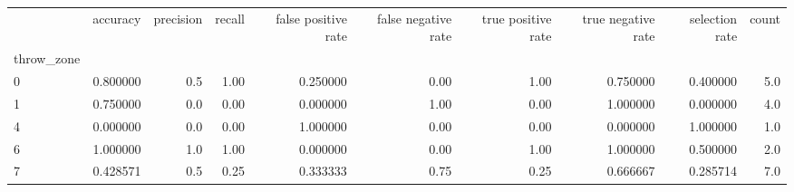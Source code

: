 \begin{tabular}{lrrrrrrrrr}
\toprule
{} &  accuracy &  precision &  recall &  false positive rate &  false negative rate &  true positive rate &  true negative rate &  selection rate &  count \\
throw\_zone &           &            &         &                      &                      &                     &                     &                 &        \\
\midrule
0          &  0.800000 &        0.5 &    1.00 &             0.250000 &                 0.00 &                1.00 &            0.750000 &        0.400000 &    5.0 \\
1          &  0.750000 &        0.0 &    0.00 &             0.000000 &                 1.00 &                0.00 &            1.000000 &        0.000000 &    4.0 \\
4          &  0.000000 &        0.0 &    0.00 &             1.000000 &                 0.00 &                0.00 &            0.000000 &        1.000000 &    1.0 \\
6          &  1.000000 &        1.0 &    1.00 &             0.000000 &                 0.00 &                1.00 &            1.000000 &        0.500000 &    2.0 \\
7          &  0.428571 &        0.5 &    0.25 &             0.333333 &                 0.75 &                0.25 &            0.666667 &        0.285714 &    7.0 \\
\bottomrule
\end{tabular}
